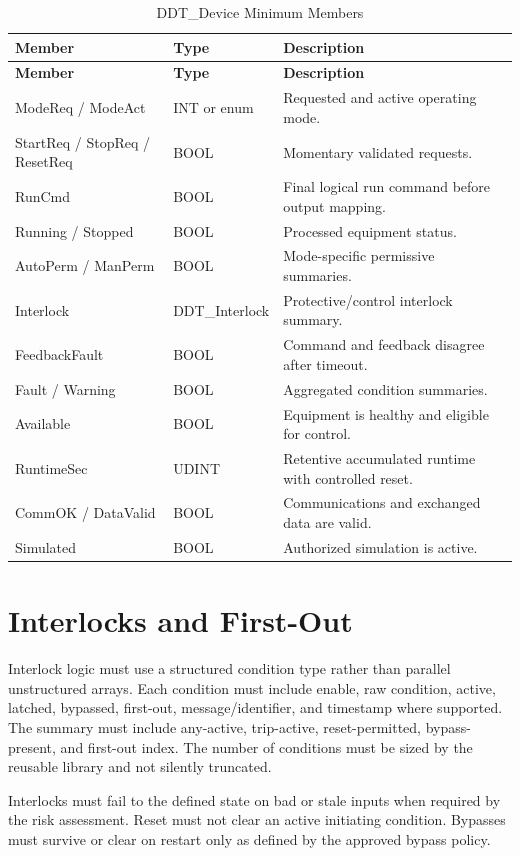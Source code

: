 \begin{longtable}{@{}p{3.3cm}p{3cm}p{6.7cm}@{}}
\caption{DDT\_Device Minimum Members}\label{tab:ddt-device}\\
\toprule \rowcolor{tblhead}\textbf{Member} & \textbf{Type} & \textbf{Description}\\ \midrule
\endfirsthead
\toprule \rowcolor{tblhead}\textbf{Member} & \textbf{Type} & \textbf{Description}\\ \midrule
\endhead
ModeReq / ModeAct & INT or enum & Requested and active operating mode.\\
StartReq / StopReq / ResetReq & BOOL & Momentary validated requests.\\
RunCmd & BOOL & Final logical run command before output mapping.\\
Running / Stopped & BOOL & Processed equipment status.\\
AutoPerm / ManPerm & BOOL & Mode-specific permissive summaries.\\
Interlock & DDT\_Interlock & Protective/control interlock summary.\\
FeedbackFault & BOOL & Command and feedback disagree after timeout.\\
Fault / Warning & BOOL & Aggregated condition summaries.\\
Available & BOOL & Equipment is healthy and eligible for control.\\
RuntimeSec & UDINT & Retentive accumulated runtime with controlled reset.\\
CommOK / DataValid & BOOL & Communications and exchanged data are valid.\\
Simulated & BOOL & Authorized simulation is active.\\
\bottomrule
\end{longtable}

\section{Interlocks and First-Out}
Interlock logic must use a structured condition type rather than parallel unstructured arrays. Each condition must include enable, raw condition, active, latched, bypassed, first-out, message/identifier, and timestamp where supported. The summary must include any-active, trip-active, reset-permitted, bypass-present, and first-out index. The number of conditions must be sized by the reusable library and not silently truncated.

Interlocks must fail to the defined state on bad or stale inputs when required by the risk assessment. Reset must not clear an active initiating condition. Bypasses must survive or clear on restart only as defined by the approved bypass policy.

